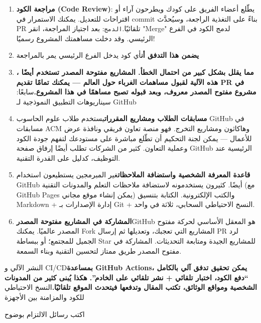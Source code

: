 \begin{enumerate}
  \item \textbf{مراجعة الكود (Code Review)}: يطّلع أعضاء الفريق على كودك ويطرحون آراء أو اقتراحات للتعديل. يمكنك الاستمرار في commit بناءً على التغذية الراجعة، وسيُحدَّث PR تلقائيًا.\texttt{الدمج}: بعد اجتياز المراجعة، انقر "Merge" لدمج الكود في الفرع الرئيسي. وقد دخلت مساهمتك المشروع رسميًا!
  \item \textbf{يضمن هذا التدفق أن}أي كود يدخل الفرع الرئيسي يمر بالمراجعة
  \item \textbf{، مما يقلل بشكل كبير من احتمال الخطأ. المشاريع مفتوحة المصدر تستخدم أيضًا هذه الآلية لقبول مساهمات الغرباء حول العالم — يمكنك تمامًا تقديم PR في مشروع مفتوح المصدر معروف، وبعد قبوله تصبح مساهمًا في هذا المشروع.}سابعًا: سيناريوهات التطبيق النموذجية لـ GitHub
  \item \textbf{مسابقات الطلاب ومشاريع المقررات}يستخدم طلاب علوم الحاسوب GitHub في مسابقات ACM وهاكاثون ومشاريع التخرج. فهو منصة تعاون فريقي ونافذة عرض للأعمال — يمكن لجنة التحكيم أن تطّلع مباشرة على مستودعك لتفهم جودة الكود وعملية التعاون. كثير من الشركات تطلب أيضًا إرفاق صفحة GitHub الرئيسية عند التوظيف، كدليل على القدرة التقنية.
  \item \textbf{قاعدة المعرفة الشخصية واستضافة الملاحظات}غير المبرمجين يستطيعون استخدام GitHub أيضًا. كثيرون يستخدمونه لاستضافة ملاحظات التعلم والمدونات التقنية (مع GitHub Pages يمكن إنشاء موقع مجاني) والكتب الإلكترونية. الكتابة بتنسيق Markdown + إدارة الإصدارات بـ Git + النسخ الاحتياطي السحابي، ثلاثة في واحد.
  \item \textbf{المشاركة في المشاريع مفتوحة المصدر}GitHub هو المعقل الأساسي لحركة مفتوح المصدر عالميًا. يمكنك Fork المشاريع التي تعجبك، وتعديلها ثم إرسال PR لرد الجميل للمجتمع؛ أو ببساطة Star للمشاريع الجيدة ومتابعة التحديثات. المشاركة في مفتوح المصدر طريق ممتاز لتحسين التقنية وبناء السمعة.
\end{enumerate}

النشر الآلي و CI/CD\textbf{بمساعدة GitHub Actions، يمكن تحقيق تدفق آلي بالكامل “دفع الكود، اختبار تلقائي + نشر تلقائي على الخادم”. هكذا يُبنى كثير من المدونات الشخصية ومواقع الوثائق، تكتب المقال وتدفعها فيتحدث الموقع تلقائيًا.}النسخ الاحتياطي للكود والمزامنة بين الأجهزة



اكتب رسائل الالتزام بوضوح


